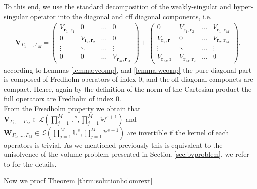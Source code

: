 \documentclass{article}
\newcommand{\IU}{{\mathbb U}}
\newcommand{\IT}{{\mathbb T}}
\newcommand{\IW}{{\mathbb W}}
\newcommand{\IY}{{\mathbb Y}}
\newcommand{\br}{\bm{r}}
\begin{document}
To this end, we use the standard decomposition of the weakly-singular and hyper-singular operator into the diagonal and off diagonal components, i.e.
\begin{align*}
\mathbf{V}_{\Gamma_1,\hdots,\Gamma_M} =
\begin{pmatrix}
V_{\br_1,\br_1} &0& \hdots &0\\
0& V_{\br_2,\br_2}& \hdots &0\\
\vdots & \ddots &\hdots & \vdots\\
0 & 0 &\hdots & V_{\br_M, \br_M}
\end{pmatrix}
+
\begin{pmatrix}
0 &V_{\br_1,\br_2}& \hdots &V_{\br_1,\br_M}\\
V_{\br_2,\br_1}& 0& \hdots &V_{\br_2,\br_M}\\
\vdots & \ddots &\hdots & \vdots\\
V_{\br_M,\br_1} & V_{\br_M,\br_2} &\hdots & 0
\end{pmatrix},
\end{align*}
according to Lemmas \ref{lemma:vcomp}, and \ref{lemma:wcomp} the pure diagonal part is composed of Fredholm operators of index $0$, and the off diagonal componets are compact. Hence, again by the definition of the norm of the Cartesian product the full operators are Fredholm of index $0$. \\
From the Freedholm property  we obtain that $\mathbf{V}_{\Gamma_1,\hdots,\Gamma_M} \in \mathcal{L} \left( \prod_{j=1}^M \IT^{s}, \prod_{j=1}^M \IW^{s+1} \right)$ and $\mathbf{W}_{\Gamma_1,\hdots,\Gamma_M} \in \mathcal{L} \left( \prod_{j=1}^M \IU^{s}, \prod_{j=1}^M \IY^{s-1} \right)$ are invertible if the kernel of each operators is trivial. As we mentioned previously this is equivalent to the unisolvence of the volume problem presented in Section \ref{sec:bvproblem}, we refer to \cite{JHP20} for the details.

Now we proof Theorem \ref{thrm:solutionholomrext}
\end{document}
